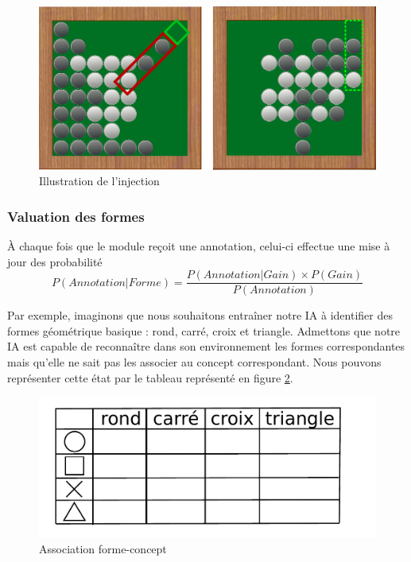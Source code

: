 \begin{figure}[H] 
\includegraphics[width=\textwidth]{files/raisonneur/cbs_reco3} 
\caption{Illustration de l'injection} 
\label{cbs_reco3}
\end{figure}

\subsubsection{Valuation des formes}

À chaque fois que le module reçoit une annotation, celui-ci effectue une mise à jour des probabilité
\[ P(Annotation|Forme) = \frac{P(Annotation|Gain) \times P(Gain)}{P(Annotation)} \]

Par exemple, imaginons que nous souhaitons entraîner notre IA à identifier des formes géométrique basique : rond, carré, croix et triangle. Admettons que notre IA est capable de reconnaître dans son environnement les formes correspondantes mais qu'elle ne sait pas les associer au concept correspondant. Nous pouvons représenter cette état par le tableau représenté en figure \ref{img_annotations}.

\begin{figure}[H] 
\includegraphics[width=\textwidth]{files/raisonneur/annotations} 
\caption{Association forme-concept} 
\label{img_annotations}
\end{figure}

